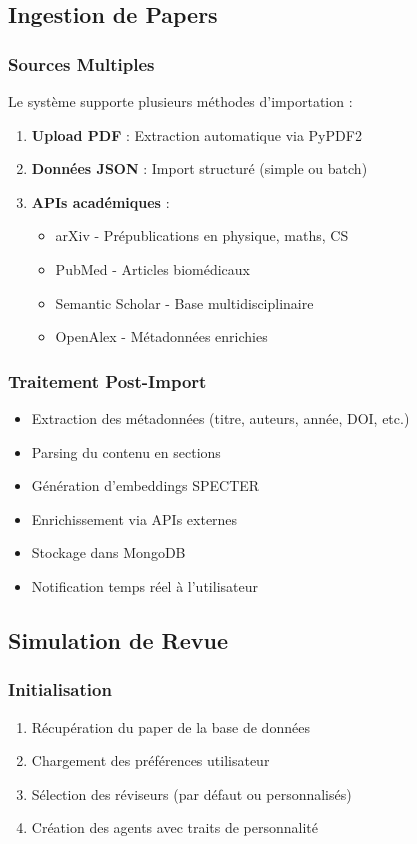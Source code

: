 \documentclass[12pt,a4paper]{article}
\begin{document}
\subsection{Ingestion de Papers}

\subsubsection{Sources Multiples}
Le système supporte plusieurs méthodes d'importation :
\begin{enumerate}
    \item \textbf{Upload PDF} : Extraction automatique via PyPDF2
    \item \textbf{Données JSON} : Import structuré (simple ou batch)
    \item \textbf{APIs académiques} : 
    \begin{itemize}
        \item arXiv - Prépublications en physique, maths, CS
        \item PubMed - Articles biomédicaux
        \item Semantic Scholar - Base multidisciplinaire
        \item OpenAlex - Métadonnées enrichies
    \end{itemize}
\end{enumerate}

\subsubsection{Traitement Post-Import}
\begin{itemize}
    \item Extraction des métadonnées (titre, auteurs, année, DOI, etc.)
    \item Parsing du contenu en sections
    \item Génération d'embeddings SPECTER
    \item Enrichissement via APIs externes
    \item Stockage dans MongoDB
    \item Notification temps réel à l'utilisateur
\end{itemize}

\subsection{Simulation de Revue}

\subsubsection{Initialisation}
\begin{enumerate}
    \item Récupération du paper de la base de données
    \item Chargement des préférences utilisateur
    \item Sélection des réviseurs (par défaut ou personnalisés)
    \item Création des agents avec traits de personnalité
\end{enumerate}
\end{document}
